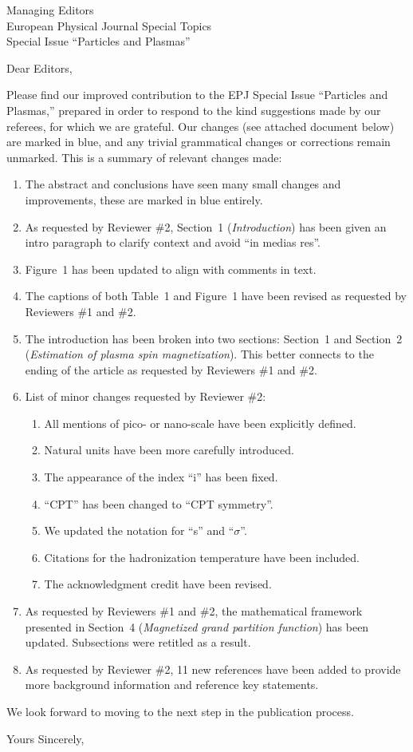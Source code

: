 \documentclass{letter}
\date{March 24, 2025}
\begin{document}
\begin{letter}{Managing Editors\\European Physical Journal Special Topics\\Special Issue ``Particles and Plasmas''}
\opening{Dear Editors,}
 
Please find our improved contribution to the EPJ Special Issue ``Particles and Plasmas,'' prepared in order to respond to the kind suggestions made by our referees, for which we are grateful. Our changes (see attached document below) are marked in blue, and any trivial grammatical changes or corrections remain unmarked. This is a summary of relevant changes made:

\begin{enumerate}
    \item The abstract and conclusions have seen many small changes and improvements, these are marked in blue entirely.
    \item As requested by Reviewer \#2, Section~1 (\textit{Introduction}) has been given an intro paragraph  to clarify context and avoid ``in medias res''.  
    \item Figure~1 has been updated to align with comments in text.
    \item The captions of both Table~1 and Figure~1 have been revised as requested by Reviewers \#1 and \#2.
    \item The introduction has been broken into two sections: Section~1 and Section~2 (\textit{Estimation of plasma spin magnetization}). This better connects to the ending of the article as requested by Reviewers \#1 and \#2.
    \item List of minor changes requested by Reviewer \#2:
    \begin{enumerate}
        \item All mentions of pico- or nano-scale have been explicitly defined.
        \item Natural units have been more carefully introduced.
        \item The appearance of the index ``i'' has been fixed.
        \item ``CPT'' has been changed to ``CPT symmetry''.
        \item We updated the notation for ``s'' and ``$\sigma$''.
        \item Citations for the hadronization temperature have been included.
        \item The acknowledgment credit have been revised.
    \end{enumerate}
    \item As requested by Reviewers \#1 and \#2, the mathematical framework presented in Section~4 (\textit{Magnetized grand partition function}) has been updated. Subsections were retitled as a result. 
    \item As requested by Reviewer \#2, 11 new references have been added to provide more background information and reference key statements.
\end{enumerate}

We look forward to moving to the next step in the publication process.

\closing{Yours Sincerely,}

\end{letter}
\end{document}
